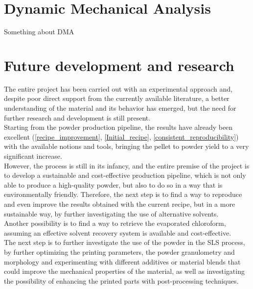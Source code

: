 \documentclass{article}
\begin{document}
        \clearpage

    \section{Dynamic Mechanical Analysis\label{DMA}}
 
    Something about DMA 

    \clearpage
    \section{Future development and research\label{Future_development_and_research}}

    The entire project has been carried out with an experimental approach and, despite poor direct support 
    from the currently available literature, a better understanding of 
    the material and its behavior has emerged, but the need for further research and development is still 
    present. \\ 

    Starting from the powder production pipeline, the results have already been excellent (\ref{recipe_improvement}, \ref{Initial_recipe}, 
    \ref{consistent_reproducibility}) with the available notions and tools, bringing the pellet to powder yield to 
    a very significant increase. \\ 

    However, the process is still in its infancy, and the entire premise of the project is to develop a sustainable 
    and cost-effective production pipeline, which is not only able to produce a high-quality powder, but also 
    to do so in a way that is environmentally friendly. Therefore, the next step is to find a way to reproduce and 
    even improve the results obtained with the current recipe, but in a more sustainable way, by further 
    investigating the use of alternative solvents. \\ 

    Another possibility is to find a way to retrieve the evaporated chloroform, assuming an effective solvent recovery 
    system is available and cost-effective. \\ 

    The next step is to further investigate the use of the powder in the SLS process, by further optimizing the 
    printing parameters, the powder granulometry and morphology and experimenting with different additives or material blends that 
    could improve the mechanical properties of the material, as well as investigating the possibility of enhancing the printed parts 
    with post-processing techniques. \\ 


    \clearpage

    \printbibliography
\end{document}
